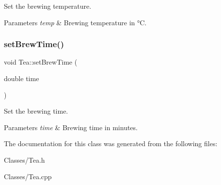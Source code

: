 Set the brewing temperature. 


\begin{DoxyParams}{Parameters}
{\em temp} & Brewing temperature in °C. \\
\hline
\end{DoxyParams}
\mbox{\label{classTea_a3f9bb73bd2d9978b63f1dd1a2463f025}} 
\subsubsection{\texorpdfstring{set\+Brew\+Time()}{setBrewTime()}}
{\footnotesize\ttfamily void Tea\+::set\+Brew\+Time (\begin{DoxyParamCaption}\item[{double}]{time }\end{DoxyParamCaption})}



Set the brewing time. 


\begin{DoxyParams}{Parameters}
{\em time} & Brewing time in minutes. \\
\hline
\end{DoxyParams}


The documentation for this class was generated from the following files\+:\begin{DoxyCompactItemize}
\item 
Classes/Tea.\+h\item 
Classes/Tea.\+cpp\end{DoxyCompactItemize}
